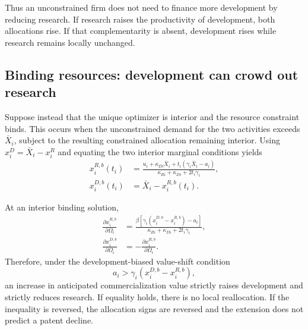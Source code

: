 Thus an unconstrained firm does not need to finance more development by
reducing research. If research raises the productivity of development, both
allocations rise. If that complementarity is absent, development rises while
research remains locally unchanged.

\subsection{Binding resources: development can crowd out research}
\label{subsec:erd-binding}

Suppose instead that the unique optimizer is interior and the resource
constraint binds. This occurs when the unconstrained demand for the two
activities exceeds \(\bar X_i\), subject to the resulting constrained
allocation remaining interior. Using \(x_i^D=\bar X_i-x_i^R\) and equating
the two interior marginal conditions yields
\begin{align}
  x_i^{R,b}(t_i)
  &=
  \frac{u_i+\kappa_{Di}\bar X_i
        +t_i(\gamma_i\bar X_i-a_i)}
       {\kappa_{Ri}+\kappa_{Di}+2t_i\gamma_i},
  \label{eq:erd-binding-research}\\
  x_i^{D,b}(t_i)&=\bar X_i-x_i^{R,b}(t_i).
  \label{eq:erd-binding-development}
\end{align}

\begin{extensionproposition}
\label{prop:erd-binding}
At an interior binding solution,
\begin{align}
  \frac{\partial x_i^{R,b}}{\partial\Omega_i}
  &=
  \frac{\beta[\gamma_i(x_i^{D,b}-x_i^{R,b})-a_i]}
       {\kappa_{Ri}+\kappa_{Di}+2t_i\gamma_i},
  \label{eq:erd-binding-research-cs}\\
  \frac{\partial x_i^{D,b}}{\partial\Omega_i}
  &=-\frac{\partial x_i^{R,b}}{\partial\Omega_i}.
  \label{eq:erd-binding-development-cs}
\end{align}
Therefore, under the development-biased value-shift condition
\begin{equation}
  a_i>\gamma_i(x_i^{D,b}-x_i^{R,b}),
  \label{eq:erd-development-biased-condition}
\end{equation}
an increase in anticipated commercialization value strictly raises
development and strictly reduces research. If equality holds, there is no
local reallocation. If the inequality is reversed, the allocation signs are
reversed and the extension does not predict a patent decline.
\end{extensionproposition}

